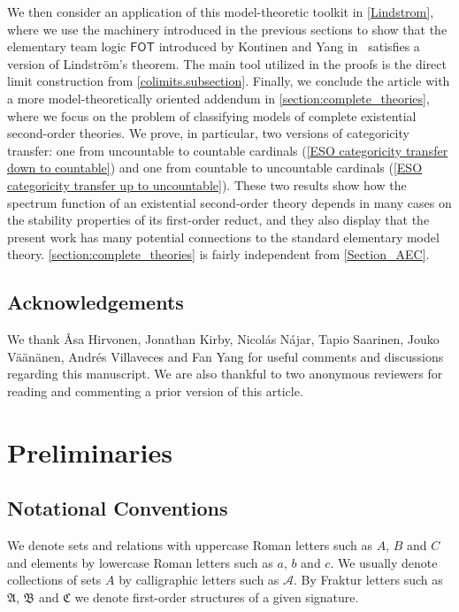 \documentclass[a4paper]{amsart}
\theoremstyle{definition}
\theoremstyle{remark}
\newcommand{\A}{\mathcal{A}}
\newcommand{\B}{\mathcal{B}}
\newcommand{\C}{\mathcal{C}}
\newcommand\fot{\mathsf{FOT}}
\theoremstyle{definition}
\renewcommand{\A}{\mathfrak{A}}
\renewcommand{\B}{\mathfrak{B}}
\renewcommand{\C}{\mathfrak{C}}
\begin{document}
We then consider an application of this model-theoretic toolkit in \cref{Lindstrom}, where we use the machinery introduced in the previous sections to show  that the elementary team logic $\fot$ introduced by Kontinen and Yang in~\cite{MR4594292} satisfies a version of Lindström's theorem. The main tool utilized in the proofs is the direct limit construction from \cref{colimits.subsection}. Finally, we conclude the article with a more model-theoretically oriented addendum in \cref{section:complete_theories}, where we focus on the problem of classifying models of complete existential second-order theories. We prove, in particular, two versions of categoricity transfer: one from uncountable to countable cardinals (\cref{ESO categoricity transfer down to countable}) and one from countable to uncountable cardinals (\cref{ESO categoricity transfer up to uncountable}). These two results show how the spectrum function of an existential second-order theory depends in many cases on the stability properties of its first-order reduct, and they also display that the present work has many potential connections to the standard elementary model theory. \cref{section:complete_theories} is fairly independent from \cref{Section_AEC}.

\subsection*{Acknowledgements}
We thank Åsa Hirvonen, Jonathan Kirby, Nicolás Nájar, Tapio Saarinen, Jouko Väänänen, Andrés Villaveces and Fan Yang for useful comments and discussions regarding this manuscript. We are also thankful to two anonymous reviewers for reading and commenting a prior version of this article.



\section{Preliminaries}\label{Section_Preliminaries}


\subsection{Notational Conventions}

We denote sets and relations with uppercase Roman letters such as $A$, $B$ and $C$ and elements by lowercase Roman letters such as $a$, $b$ and $c$. We usually denote collections of sets $A$ by calligraphic letters such as $\mathcal{A}$. By Fraktur letters such as $\A$, $\B$ and $\C$ we denote first-order structures of a given signature.
\end{document}
